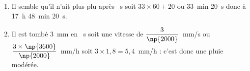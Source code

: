 %

\begin{enumerate}
\item %
Il semble qu'il n'ait plus plu après ~s soit $33 \times 60 + 20$ ou 33~min 20~s donc à 17~h 48~min 20~s. 

\item %

%
Il est tombé 3~mm en ~s soit une vitesse de $\dfrac{3}{\np{2000}}$~mm/s ou $\dfrac{3 \times \np{3600}}{\np{2000}}$~mm/h soit $3 \times 1,8 = 5,4$~mm/h : c'est donc une pluie modérée.
\end{enumerate}

\vspace{0,5cm}

